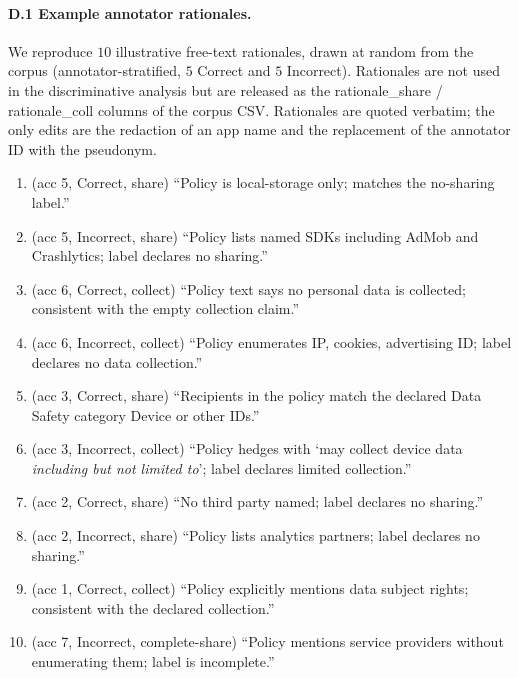 \documentclass[11pt,a4paper]{article}
\newcommand{\dec}[1]{\textsf{#1}}
\begin{document}
\paragraph{D.1 Example annotator rationales.}
\label{app:rationales}
We reproduce $10$ illustrative free-text rationales, drawn at random
from the corpus (annotator-stratified, $5$ Correct and $5$ Incorrect).
Rationales are not used in the discriminative analysis but are
released as the \dec{rationale\_share} / \dec{rationale\_coll} columns
of the corpus CSV. Rationales are quoted verbatim; the only edits are
the redaction of an app name and the replacement of the annotator ID
with the pseudonym.

\begin{enumerate}[leftmargin=*,itemsep=1pt,topsep=2pt]
\item (\dec{acc 5}, Correct, share) ``Policy is local-storage only;
matches the no-sharing label.''
\item (\dec{acc 5}, Incorrect, share) ``Policy lists named SDKs
including AdMob and Crashlytics; label declares no sharing.''
\item (\dec{acc 6}, Correct, collect) ``Policy text says no personal
data is collected; consistent with the empty collection claim.''
\item (\dec{acc 6}, Incorrect, collect) ``Policy enumerates IP,
cookies, advertising ID; label declares no data collection.''
\item (\dec{acc 3}, Correct, share) ``Recipients in the policy match
the declared Data Safety category Device or other IDs.''
\item (\dec{acc 3}, Incorrect, collect) ``Policy hedges with `may
collect device data \emph{including but not limited to}'; label
declares limited collection.''
\item (\dec{acc 2}, Correct, share) ``No third party named; label
declares no sharing.''
\item (\dec{acc 2}, Incorrect, share) ``Policy lists analytics
partners; label declares no sharing.''
\item (\dec{acc 1}, Correct, collect) ``Policy explicitly mentions
data subject rights; consistent with the declared collection.''
\item (\dec{acc 7}, Incorrect, complete-share) ``Policy mentions
service providers without enumerating them; label is incomplete.''
\end{enumerate}

\end{document}
